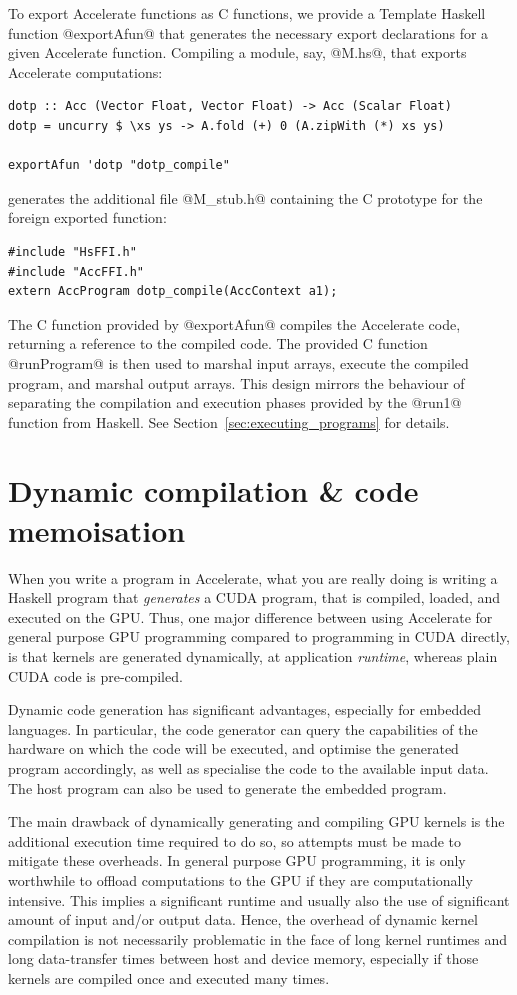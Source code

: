 To export Accelerate functions as C functions, we provide a Template
Haskell~\cite{Sheard:2002wu} function @exportAfun@ that generates the necessary
export declarations for a given Accelerate function. Compiling a module, say,
@M.hs@, that exports Accelerate computations:
%
\begin{lstlisting}[style=haskell]
dotp :: Acc (Vector Float, Vector Float) -> Acc (Scalar Float)
dotp = uncurry $ \xs ys -> A.fold (+) 0 (A.zipWith (*) xs ys)

exportAfun 'dotp "dotp_compile"
\end{lstlisting}
%
generates the additional file @M_stub.h@ containing the C prototype for the
foreign exported function:
%
\begin{lstlisting}[style=cuda]
#include "HsFFI.h"
#include "AccFFI.h"
extern AccProgram dotp_compile(AccContext a1);
\end{lstlisting}
%
The C function provided by @exportAfun@ compiles the Accelerate code, returning
a reference to the compiled code. The provided C function @runProgram@ is then
used to marshal input arrays, execute the compiled program, and marshal output
arrays. This design mirrors the behaviour of separating the compilation and
execution phases provided by the @run1@ function from Haskell. See
Section~\ref{sec:executing_programs} for details.


\section{Dynamic compilation \& code memoisation}
\label{sec:dynamic_compilation}

When you write a program in Accelerate, what you are really doing is writing a
Haskell program that \emph{generates} a CUDA program, that is compiled,
loaded, and executed on the GPU\@. Thus, one major difference between using
Accelerate for general purpose GPU programming compared to programming in
CUDA directly, is that kernels are generated dynamically, at application
\emph{runtime}, whereas plain CUDA code is pre-compiled.

Dynamic code generation has significant advantages, especially for embedded
languages. In particular, the code generator can query the capabilities of the
hardware on which the code will be executed, and optimise the generated program
accordingly, as well as specialise the code to the available input data. The
host program can also be used to generate the embedded program.

The main drawback of dynamically generating and compiling GPU kernels is the
additional execution time required to do so, so attempts must be made to
mitigate these overheads. In general purpose GPU programming, it is only
worthwhile to offload computations to the GPU if they are computationally
intensive. This implies a significant runtime and usually also the use of
significant amount of input and/or output data. Hence, the overhead of dynamic
kernel compilation is not necessarily problematic in the face of long kernel
runtimes and long data-transfer times between host and device memory, especially
if those kernels are compiled once and executed many times.

